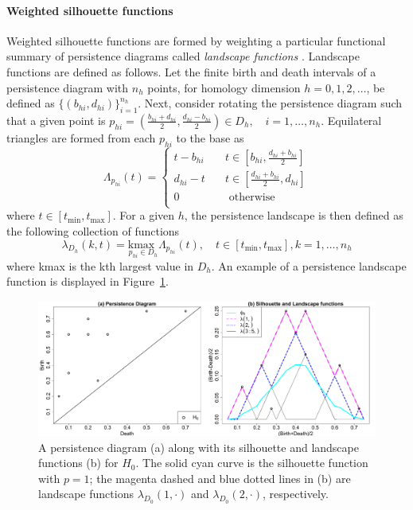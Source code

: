 \documentclass[12pt]{article}
\begin{document}
\paragraph{Weighted silhouette functions}
Weighted silhouette functions are formed by weighting a particular functional summary of persistence diagrams called \emph{landscape functions} \citep{bubenik2015statistical}.
Landscape functions are defined as follows. Let the finite birth and death intervals of a persistence diagram with $n_h$ points, for homology dimension $h = 0, 1, 2, \ldots$, be defined as $\{(b_{hi},d_{hi})\}_{i = 1}^{n_h}$.  Next, consider rotating the persistence diagram such that a given point is $p_{hi} = \left(\frac{b_{hi}+d_{hi}}{2}, \frac{d_{hi}-b_{hi}}{2}\right) \in D_h, \quad i = 1, \ldots, n_h$.  Equilateral triangles are formed from each $p_{hi}$ to the base as
\begin{equation*}
\Lambda_{p_{hi}}(t) =
  \begin{cases}
    t - b_{hi}  & \quad t \in [b_{hi}, \frac{d_{hi}+b_{hi}}{2}]\\
    d_{hi} - t  & \quad t \in [\frac{d_{hi}+b_{hi}}{2}, d_{hi}]\\
    0  & \quad \text{ otherwise}\\
  \end{cases}
\end{equation*}
where $t \in [t_{\min}, t_{\max}]$. For a given $h$, the persistence landscape is then defined as the following collection of functions
%
\begin{equation*}
\lambda_{D_h}(k, t) = \underset{p_{hi}\in D_h}{\text{kmax }} \Lambda_{p_{hi}}(t), \quad t \in [t_{\min}, t_{\max}], k = 1, \ldots, n_h
\end{equation*}
where kmax is the kth largest value in $D_h$.  An example of a persistence landscape function is displayed in Figure~\ref{fig:landscape}.

\begin{center}
\begin{figure}[htp!]
  \centering
  \includegraphics[width=0.95\linewidth]{fig_landscape_jjc.pdf}
    \caption{A persistence diagram (a) along with its silhouette and landscape functions (b) for $H_0$.  The solid cyan curve is the silhouette function with $p = 1$; the magenta dashed and blue dotted lines in (b) are landscape functions $\lambda_{D_0}(1, \cdot)$ and $\lambda_{D_0}(2, \cdot)$, respectively.}
    \label{fig:landscape}
\end{figure}
\end{center}
\end{document}
